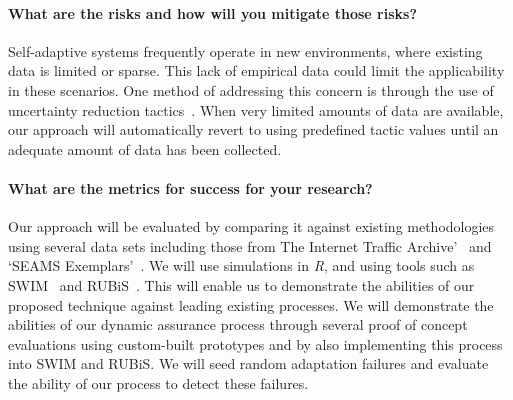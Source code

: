 \documentclass[12pt]{article}
\begin{document}



\vspace{-5mm}\paragraph{What are the risks and how will you mitigate those risks? }Self-adaptive systems frequently operate in new environments, where existing data is limited or sparse. This lack of empirical data could limit the applicability in these scenarios. One method of addressing this concern is through the use of uncertainty reduction tactics~\cite{moreno2018uncertainty}. When very limited amounts of data are available, our approach will automatically revert to using predefined tactic values until an adequate amount of data has been collected.










\vspace{-5mm}\paragraph{What are the metrics for success for your research? }Our approach will be evaluated by comparing it against existing methodologies using several data sets including those from The Internet Traffic Archive'~\cite{InternetTrafficArchive_URL} and `SEAMS Exemplars'~\cite{SEAMS_Exemplars_URL}. We will use simulations in \emph{R}, and using tools such as SWIM~\cite{moreno2018swim} and RUBiS~\cite{Rubis_URL}. This will enable us to demonstrate the abilities of our proposed technique against leading existing processes. We will demonstrate the abilities of our dynamic assurance process through several proof of concept evaluations using custom-built prototypes and by also implementing this process into SWIM and RUBiS. We will seed random adaptation failures and evaluate the ability of our process to detect these failures.
\end{document}
